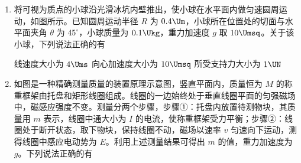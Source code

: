 \documentclass[\gkver]{gaokaozhenti}
\begin{document}
\begin{enumerate}
{若假设 $v_{1} = 2v$，则 $v_{2} = 3v$，此时满足

$\frac{1}{2} \cdot 3m(4v)^{2} + \frac{1}{2} \cdot 2m(6v)^{2} > \frac{1}{2} \cdot 3mv_{1}^{2} + \frac{1}{2} \cdot 2mv_{2}^{2}$

则假设成立，因 M、N 的加速度大小之比仍为 $2:3$，则停止运动的时间之比为 $1:1$，对 M 来说碰撞前后的速度之比为 $4v:2v = 2:1$

可知碰撞前后运动时间之比为 $2:1$，可知 A 正确，C 错误。

故选 A。
}

\item
将可视为质点的小球沿光滑冰坑内壁推出，使小球在水平面内做匀速圆周运动，如图所示。已知圆周运动半径 $R$ 为 $0.4 \Um$，小球所在位置处的切面与水平面夹角 $\theta$ 为 $45^\circ$，小球质量为 $0.1 \Ukg$，重力加速度 $g$ 取 $10 \Umsq$。关于该小球，下列说法正确的有


{线速度大小为 $4 \Ums$}
{向心加速度大小为 $10 \Umsq$}
{所受支持力大小为 $1 \UN$}


\item
如图是一种精确测量质量的装置原理示意图，竖直平面内，质量恒为 $M$ 的称重框架由托盘和矩形线圈组成。线圈的一边始终处于垂直线圈平面的匀强磁场中，磁感应强度不变。测量分两个步骤，步骤①：托盘内放置待测物块，其质量用 $m$ 表示，线圈中通大小为 $I$ 的电流，使称重框架受力平衡；步骤②：线圈处于断开状态，取下物块，保持线圈不动，磁场以速率 $v$ 匀速向下运动，测得线圈中感应电动势为 $E$。利用上述测量结果可得出 $m$ 的值，重力加速度为 $g$。下列说法正确的有


\end{enumerate}
\end{document}
